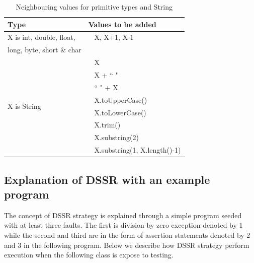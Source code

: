 \documentclass[conference]{IEEEtran}
\begin{document}
\begin{table}[ht]
\caption{Neighbouring values for primitive types and String} %
\centering %
\begin{tabular}{| l | l |} %
\hline\hline %
Type & Values to be added\\ [0.5ex] %
\hline %
\multirow{1}{*}{X is int, double, float, } & ~ X,  X+1, X-1 \\ %
\multirow{1}{*}{long, byte, short \& char} &  \\ 

\hline
\multirow{8}{*}{X is String} & ~ X\\ %

& ~ X + ``  "\\ %
& ~ ``  " + X \\ %
& ~ X.toUpperCase() \\
& ~ X.toLowerCase() \\
& ~ X.trim() \\
& ~ X.substring(2) \\
& ~ X.substring(1, X.length()-1) \\[1ex]
\hline
\hline %
\end{tabular}
\label{table:addvalues} %
\end{table}







\subsection{Explanation of DSSR with an example program}
The concept of DSSR strategy is explained through a simple program seeded with at least three faults. The first is division by zero exception denoted by 1 while the second and third are in the form of assertion statements denoted by 2 and 3 in the following program.  Below we describe how DSSR strategy perform execution when the following class is expose to testing.\\


\begingroup

    \fontsize{7pt}{8pt}\selectfont
    
\end{document}
